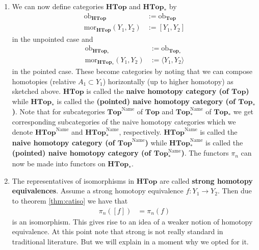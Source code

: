 \begin{enumerate}
For $n \geq 1$, $\pi_{n}$ is actually a functor from $\mathbf{Top}_{\ast}$ to $\mathbf{Grp}$ (and for $n \geq 2$ even to $\mathbf{Ab}$).
Note that $\pi_{0}(Y)$ is not actually a group.
\item[$\bullet$]
We can now define categories $\mathbf{HTop}$ and $\mathbf{HTop}_{\ast}$ by
\begin{align*}
  \mathrm{ob}_{\mathbf{HTop}}
  &:=
  \mathrm{ob}_{\mathbf{Top}}
  \\
  \mathrm{mor}_{\mathbf{HTop}}(Y_{1},Y_{2})
  &:=
  [Y_{1},Y_{2}]
\end{align*}
in the unpointed case and
\begin{align*}
  \mathrm{ob}_{\mathbf{HTop}_{\ast}}
  &:=
  \mathrm{ob}_{\mathbf{Top}_{\ast}}
  \\
  \mathrm{mor}_{\mathbf{HTop}_{\ast}}(Y_{1},Y_{2})
  &:=
  \langle
    Y_{1},
    Y_{2}
  \rangle
\end{align*}
in the pointed case.
These become categories by noting that we can compose homotopies (relative $A_{1} \subset Y_{1}$) horizontally (up to higher homotopy) as sketched above.
$\mathbf{HTop}$ is called the \textbf{naive homotopy category (of $\mathbf{Top}$)} while $\mathbf{HTop}_{\ast}$ is called the \textbf{(pointed) naive homotopy category (of $\mathbf{Top}_{\ast}$)}.
Note that for subcategories $\mathbf{Top}^{\textrm{Name}}$ of $\mathbf{Top}$ and $\mathbf{Top}_{\ast}^{\textrm{Name}}$ of $\mathbf{Top}_{\ast}$ we get corresponding subcategories of the naive homotopy categories which we denote $\mathbf{HTop}^{\textrm{Name}}$ and $\mathbf{HTop}_{\ast}^{\textrm{Name}}$, respectively.
$\mathbf{HTop}^{\textrm{Name}}$ is called the \textbf{naive homotopy category (of $\mathbf{Top}^{\mathrm{Name}}$)} while $\mathbf{HTop}_{\ast}^{\textrm{Name}}$ is called the \textbf{(pointed) naive homotopy category (of $\mathbf{Top}_{\ast}^{\mathrm{Name}}$)}.
The functors $\pi_{n}$ can now be made into functors on $\mathbf{HTop}_{\ast}$.
\item[$\bullet$]
The representatives of isomorphisms in $\mathbf{HTop}$ are called \textbf{strong homotopy equivalences}.
Assume a strong homotopy equivalence $f \colon Y_{1} \rightarrow Y_{2}$.
Then due to theorem \ref{thm:catiso} we have that
\begin{align*}
  \pi_{n}([f])
  &=
  \pi_{n}(f)
\end{align*}
is an isomorphism.
This gives rise to an idea of a weaker notion of homotopy equivalence.
At this point note that {\glqq}strong{\grqq} is not really standard in traditional literature.
But we will explain in a moment why we opted for it.

\end{enumerate}
